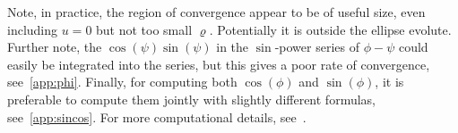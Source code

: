 \documentclass[a4paper]{amsart}
\begin{document}
\noindent
Note, in practice, the region of convergence appear to be of useful size, even including $u=0$ but not too small $\varrho$. Potentially it is outside the ellipse evolute.
%
Further note, the $\cos(\psi)\sin(\psi)$ in the $\sin$-power series of $\phi-\psi$ could easily be integrated into the series, but this gives a poor rate of convergence, see~\ref{app:phi}. %
%
%
Finally, for computing both $\cos(\phi)$ and $\sin(\phi)$, it is preferable to compute them jointly with slightly different formulas, see~\ref{app:sincos}. For more computational details, see~\cite{Nilsson2024minimax}.
\end{document}
